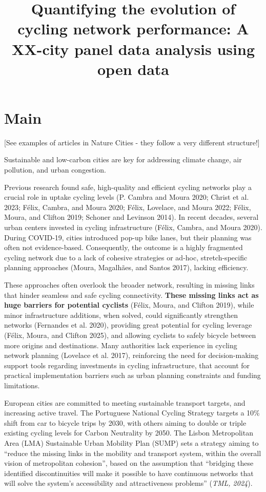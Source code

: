 \documentclass[
  sn-nature,
]{sn-jnl}
\title[Quantifying the evolution of cycling network performance: A
XX-city panel data analysis using open data]{Quantifying the evolution
of cycling network performance: A XX-city panel data analysis using open
data}
\author[1]{\fnm{Rosa} \sur{Félix}}\author*[2]{\fnm{David} \sur{Levinson}}\email{david.levinson@sydney.edu.au}
\affil[1]{\orgdiv{CERIS}, \orgname{Instituto Superior Técnico -
University of Lisbon}, \orgaddress{\street{Av Rovisco Pais
1}, \city{Lisbon}, \country{Portugal}}}
\affil[2]{\orgdiv{School of Civil Engineering}, \orgname{University of
Sydney}, \orgaddress{\street{NSW
2006}, \city{Sydney}, \country{Australia}}}
\begin{document}
\maketitle


\section{Main}\label{main}

{[}See examples of articles in Nature Cities - they follow a very
different structure!{]}

Sustainable and low-carbon cities are key for addressing climate change,
air pollution, and urban congestion.

Previous research found safe, high-quality and efficient cycling
networks play a crucial role in uptake cycling levels (P. Cambra and
Moura 2020; Christ et al. 2023; Félix, Cambra, and Moura 2020; Félix,
Lovelace, and Moura 2022; Félix, Moura, and Clifton 2019; Schoner and
Levinson 2014). In recent decades, several urban centers invested in
cycling infrastructure (Félix, Cambra, and Moura 2020). During COVID-19,
cities introduced pop-up bike lanes, but their planning was often not
evidence-based. Consequently, the outcome is a highly fragmented cycling
network due to a lack of cohesive strategies or ad-hoc, stretch-specific
planning approaches (Moura, Magalhães, and Santos 2017), lacking
efficiency.

These approaches often overlook the broader network, resulting in
missing links that hinder seamless and safe cycling connectivity.
\textbf{These missing links act as huge barriers for potential cyclists}
(Félix, Moura, and Clifton 2019), while minor infrastructure additions,
when solved, could significantly strengthen networks (Fernandes et al.
2020), providing great potential for cycling leverage (Félix, Moura, and
Clifton 2025), and allowing cyclists to safely bicycle between more
origins and destinations. Many authorities lack experience in cycling
network planning (Lovelace et al. 2017), reinforcing the need for
decision-making support tools regarding investments in cycling
infrastructure, that account for practical implementation barriers such
as urban planning constraints and funding limitations.

European cities are committed to meeting sustainable transport targets,
and increasing active travel. The Portuguese National Cycling Strategy
targets a 10\% shift from car to bicycle trips by 2030, with others
aiming to double or triple existing cycling levels for Carbon Neutrality
by 2050. The Lisbon Metropolitan Area (LMA) Sustainable Urban Mobility
Plan (SUMP) sets a strategy aiming to ``reduce the missing links in the
mobility and transport system, within the overall vision of metropolitan
cohesion'', based on the assumption that ``bridging these identified
discontinuities will make it possible to have continuous networks that
will solve the system's accessibility and attractiveness problems''
(\emph{TML, 2024}).
\end{document}
